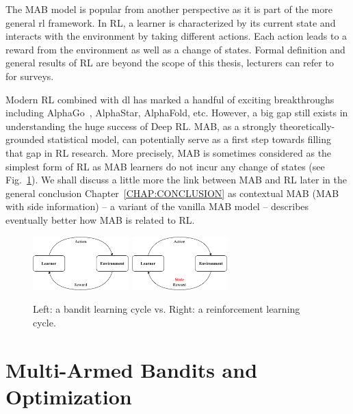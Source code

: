 The MAB model is popular from another perspective as it is part of the more general \gls{rl} framework. In RL, a learner is characterized by its current state and interacts with the environment by taking different actions. Each action leads to a reward from the environment as well as a change of states. Formal definition and general results of RL are beyond the scope of this thesis, lecturers can refer to~\cite{sutton1998,bertsekas2011approximate} for surveys. 

Modern RL combined with \gls{dl} has marked a handful of exciting breakthroughs including AlphaGo~\citep{silver2016alphago}, AlphaStar, AlphaFold, etc. However, a big gap still exists in understanding the huge success of Deep RL. MAB, as a strongly theoretically-grounded statistical model, can potentially serve as a first step towards filling that gap in RL research. More precisely, MAB is sometimes considered as the simplest form of RL as MAB learners do not incur any change of states (see Fig.~\ref{fig:intro.comparison}). We shall discuss a little more the link between MAB and RL later in the general conclusion Chapter~\ref{CHAP:CONCLUSION} as contextual MAB (MAB with side information) -- a variant of the vanilla MAB model -- describes eventually better how MAB is related to RL.

\begin{figure}[ht]
    \centering
    \includegraphics[width=0.33\textwidth]{Chapter1/img/mab.pdf}
    \includegraphics[width=0.33\textwidth]{Chapter1/img/rl.pdf}
    \caption{Left: a bandit learning cycle vs. Right: a reinforcement learning cycle.}
    \label{fig:intro.comparison}
\end{figure}

\section{Multi-Armed Bandits and Optimization}\label{sec:intro.mab}
    

